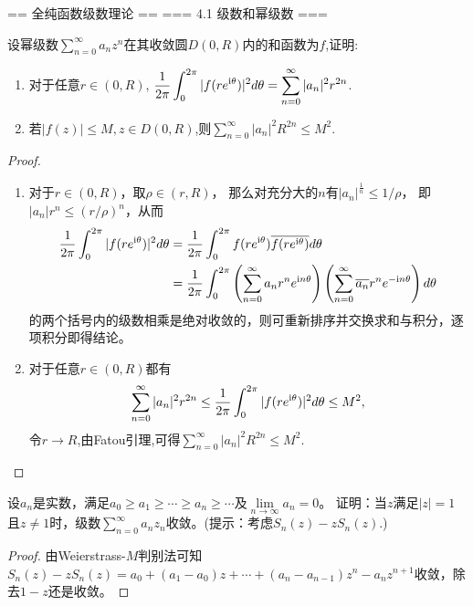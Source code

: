 == 全纯函数级数理论 ==
=== 4.1 级数和幂级数 ===
\begin{7}
    设幂级数$\sum\limits_{n=0}^{\infty}a_nz^n$在其收敛圆$D(0,R)$内的和函数为$f$,证明:
    \begin{enumerate}
        \item[(1)] 对于任意$r\in (0,R)$, $\displaystyle\frac{1}{2\pi}\int_0^{2\pi}|f(re^{{\rm i}\theta})|^2d\theta =\sum\limits_{n=0}^{\infty}|a_n|^2r^{2n}$.
        \item[(2)] 若$|f(z)|\leq M,z\in D(0,R)$,则$\displaystyle\sum_{n=0}^{\infty}|a_n|^2R^{2n}\leq M^2$.
    \end{enumerate}
\end{7}
\begin{proof}
    \begin{enumerate}
        \item[(1)] 对于$r\in(0,R)$，取$\rho\in(r,R)$，
        那么对充分大的$n$有$|a_n|^\frac{1}{n}\leqslant1/\rho$，
        即$|a_n|r^n\leqslant(r/\rho)^n$，从而
        \begin{align*}
            \frac{1}{2\pi}\int_0^{2\pi}|f(re^{{\rm i}\theta})|^2d\theta
            &=\frac{1}{2\pi}\int_0^{2\pi}f(re^{{\rm i}\theta})\overline{f(re^{{\rm i}\theta})}d\theta\\
            &=\frac{1}{2\pi}\int_0^{2\pi}\left(\sum_{n=0}^{\infty}a_nr^ne^{{\rm i}n\theta}\right)
            \left(\sum_{n=0}^{\infty}\overline{a_n}r^ne^{-{\rm i}n\theta}\right)d\theta
        \end{align*}
        的两个括号内的级数相乘是绝对收敛的，则可重新排序并交换求和与积分，逐项积分即得结论。
        \item[(2)] 对于任意$r\in(0,R)$都有
        \[\sum_{n=0}^{\infty}|a_n|^2r^{2n}
        \leq\frac{1}{2\pi}\int_0^{2\pi}|f(re^{{\rm i}\theta})|^2d\theta\le M^2,\]
        令$r\rightarrow R$,由Fatou引理,可得$\displaystyle\sum_{n=0}^{\infty}|a_n|^2R^{2n}\leq M^2$.\qedhere
    \end{enumerate}
\end{proof}
\begin{8}
    设$a_n$是实数，满足$a_0 \ge a_1 \ge\cdots\ge a_n \ge\cdots$及$\lim\limits_{n\to\infty}a_n=0$。
    证明：当$z$满足$|z|=1$且$z\ne1$时，级数$\sum\limits_{n=0}^{\infty}a_nz_n$收敛。(提示：考虑$S_n(z)-zS_n(z)$.)
\end{8}
\begin{proof}
    由Weierstrass-$M$判别法可知$S_n(z)-zS_n(z)=a_0+(a_1-a_0)z+\cdots+(a_n-a_{n-1})z^n-a_nz^{n+1}$收敛，除去$1-z$还是收敛。
\end{proof}

